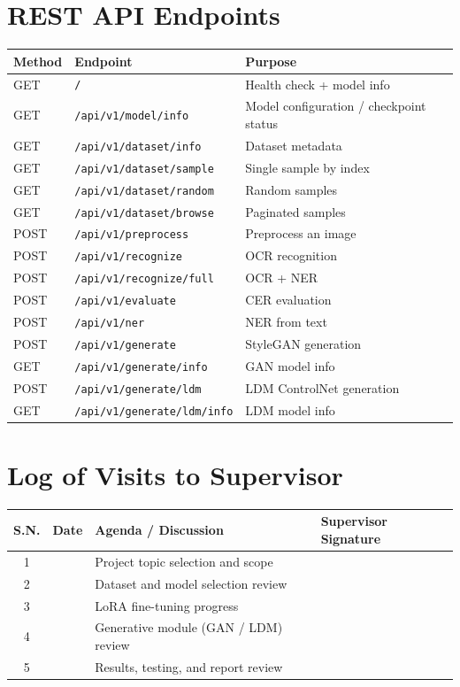 \documentclass[12pt,a4paper]{report}
\begin{document}
\section{REST API Endpoints}
\begin{longtable}{llp{6.6cm}}
\toprule
\textbf{Method} & \textbf{Endpoint} & \textbf{Purpose} \\
\midrule
GET & \texttt{/} & Health check + model info \\
GET & \texttt{/api/v1/model/info} & Model configuration / checkpoint status \\
GET & \texttt{/api/v1/dataset/info} & Dataset metadata \\
GET & \texttt{/api/v1/dataset/sample} & Single sample by index \\
GET & \texttt{/api/v1/dataset/random} & Random samples \\
GET & \texttt{/api/v1/dataset/browse} & Paginated samples \\
POST & \texttt{/api/v1/preprocess} & Preprocess an image \\
POST & \texttt{/api/v1/recognize} & OCR recognition \\
POST & \texttt{/api/v1/recognize/full} & OCR + NER \\
POST & \texttt{/api/v1/evaluate} & CER evaluation \\
POST & \texttt{/api/v1/ner} & NER from text \\
POST & \texttt{/api/v1/generate} & StyleGAN generation \\
GET & \texttt{/api/v1/generate/info} & GAN model info \\
POST & \texttt{/api/v1/generate/ldm} & LDM ControlNet generation \\
GET & \texttt{/api/v1/generate/ldm/info} & LDM model info \\
\bottomrule
\end{longtable}

\section{Log of Visits to Supervisor}
\begin{longtable}{clp{6.4cm}p{3.4cm}}
\toprule
\textbf{S.N.} & \textbf{Date} & \textbf{Agenda / Discussion} & \textbf{Supervisor Signature} \\
\midrule
1 & & Project topic selection and scope & \\
2 & & Dataset and model selection review & \\
3 & & LoRA fine-tuning progress & \\
4 & & Generative module (GAN / LDM) review & \\
5 & & Results, testing, and report review & \\
\bottomrule
\end{longtable}
\end{document}
